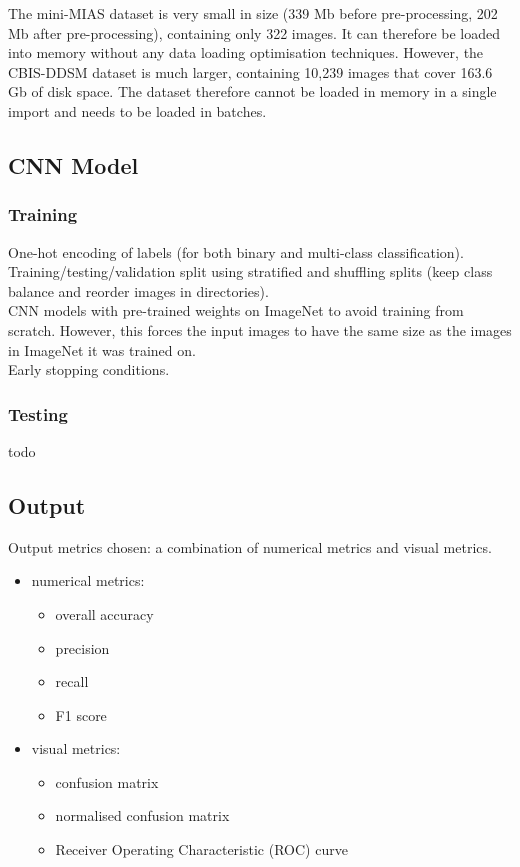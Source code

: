 The mini-MIAS dataset is very small in size (339 Mb before pre-processing, 202 Mb after pre-processing), containing only 322 images. It can therefore be loaded into memory without any data loading optimisation techniques. However, the CBIS-DDSM dataset is much larger, containing 10,239 images that cover 163.6 Gb of disk space. The dataset therefore cannot be loaded in memory in a single import and needs to be loaded in batches.\\ %

\subsection{CNN Model}

\subsubsection{Training}

One-hot encoding of labels (for both binary and multi-class classification).\\

Training/testing/validation split using stratified and shuffling splits (keep class balance and reorder images in directories).\\

CNN models with pre-trained weights on ImageNet to avoid training from scratch. However, this  forces the input images to have the same size as the images in ImageNet it was trained on.\\

Early stopping conditions.\\

\subsubsection{Testing}

todo

\subsection{Output}

Output metrics chosen: a combination of numerical metrics and visual metrics.


\begin{itemize}
    \item numerical metrics:
    \begin{itemize}
        \item overall accuracy
        \item precision
        \item recall
        \item F1 score
    \end{itemize}
    \item visual metrics:
    \begin{itemize}
        \item confusion matrix
        \item normalised confusion matrix
        \item Receiver Operating Characteristic (ROC) curve
    \end{itemize}
\end{itemize}

